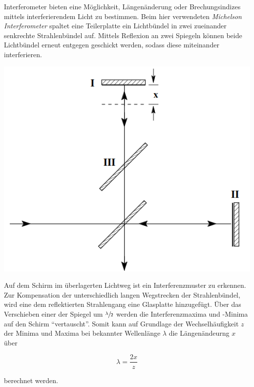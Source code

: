 \begin{minipage}{0.5\textwidth}
    Interferometer bieten eine Möglichkeit, Längenänderung oder Brechungsindizes mittels interferierendem Licht zu bestimmen.
    Beim hier verwendeten \emph{Michelson Interferometer} spaltet eine Teilerplatte ein Lichtbündel in zwei zueinander senkrechte 
    Strahlenbündel auf. Mittels Reflexion an zwei Spiegeln können beide Lichtbündel erneut entgegen geschickt werden, sodass diese miteinander 
    interferieren.
\end{minipage}
\hfill
\begin{minipage}{0.5\textwidth}
    \includegraphics[width=\textwidth]{Michelson_Interferom.png}
\end{minipage}

\noindent  Auf dem Schirm im überlagerten Lichtweg ist ein Interferenzmuster zu erkennen. Zur Kompensation der unterschiedlich langen 
Wegstrecken der Strahlenbündel, wird eine dem reflektierten Strahlengang eine Glasplatte hinzugefügt. Über das Verschieben einer der 
Spiegel um $\sfrac{\lambda}{2}$ werden die Interferenzmaxima und -Minima auf den Schirm \enquote{vertauscht}. Somit kann auf Grundlage 
der Wechselhäufigkeit $z$ der Minima und Maxima bei bekannter Wellenlänge $\lambda$ die Längenändeurng $x$ über 

\begin{equation*}
    \lambda = \frac{2x}{z}
\end{equation*}

\noindent berechnet werden.

